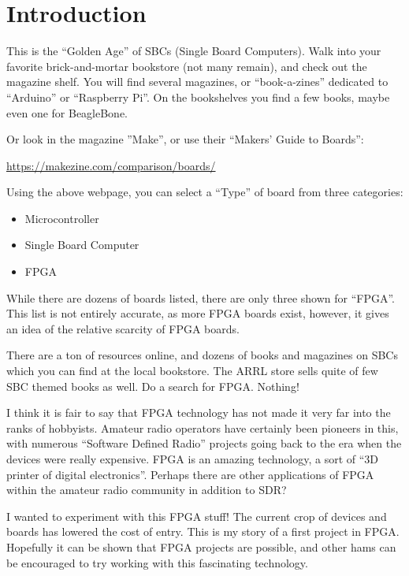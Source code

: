 \section{Introduction}

This is the ``Golden Age'' of SBCs (Single Board Computers).
Walk into your favorite brick-and-mortar bookstore (not many remain), 
and check out the magazine shelf.  You will find several magazines, or ``book-a-zines''
dedicated to ``Arduino'' or ``Raspberry Pi''.  On the bookshelves you find a few books, maybe even one for BeagleBone.

Or look in the magazine ''Make'', or use their ``Makers’ Guide to Boards'':

\url{https://makezine.com/comparison/boards/}

Using the above webpage, you can select a ``Type'' of board from three categories:

\begin{itemize}
	\item Microcontroller
	\item Single Board Computer
	\item FPGA
\end{itemize}

While there are dozens of boards listed, there are only three shown for ``FPGA''.
This list is not entirely accurate, as more FPGA boards exist, however, it gives
an idea of the relative scarcity of FPGA boards.

There are a ton of resources online, and dozens of books and magazines on SBCs which you can find at the local bookstore.
The ARRL store sells quite of few SBC themed books as well.  Do a search for FPGA.  Nothing!

I think it is fair to say that FPGA technology has not made it very far into the ranks of hobbyists.
Amateur radio operators have certainly been pioneers in this, with numerous ``Software Defined Radio''
projects going back to the era when the devices were really expensive.  FPGA is an amazing technology, a sort of ``3D printer of digital electronics''.  Perhaps there are other applications of FPGA within the amateur radio community in addition to SDR?

I wanted to experiment with this FPGA stuff! The current crop of devices and boards has lowered the cost of entry.  This is my story of a first project in FPGA.  Hopefully it can be shown that FPGA projects are possible, and other hams can be encouraged to try working with this fascinating technology.

